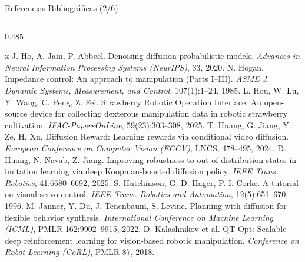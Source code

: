 \documentclass[aspectratio=169,10pt,xcolor={dvipsnames,table}]{beamer}
\begin{document}
\begin{frame}{Referencias Bibliográficas (2/6)}
\begin{columns}[T, onlytextwidth]
\begin{column}{0.485\textwidth}
      \begin{thebibliography}{x}\setlength{\itemsep}{0.8pt}
         J. Ho, A. Jain, P. Abbeel. \newblock Denoising diffusion probabilistic models. \newblock \emph{Advances in Neural Information Processing Systems (NeurIPS)}, 33, 2020.
         N. Hogan. \newblock Impedance control: An approach to manipulation (Parts I--III). \newblock \emph{ASME J. Dynamic Systems, Measurement, and Control}, 107(1):1--24, 1985.
         L. Hou, W. Lu, Y. Wang, C. Peng, Z. Fei. \newblock Strawberry Robotic Operation Interface: An open-source device for collecting dexterous manipulation data in robotic strawberry cultivation. \newblock \emph{IFAC-PapersOnLine}, 59(23):303--308, 2025.
         T. Huang, G. Jiang, Y. Ze, H. Xu. \newblock Diffusion Reward: Learning rewards via conditional video diffusion. \newblock \emph{European Conference on Computer Vision (ECCV)}, LNCS, 478--495, 2024.
         D. Huang, N. Navab, Z. Jiang. \newblock Improving robustness to out-of-distribution states in imitation learning via deep Koopman-boosted diffusion policy. \newblock \emph{IEEE Trans. Robotics}, 41:6680--6692, 2025.
         S. Hutchinson, G. D. Hager, P. I. Corke. \newblock A tutorial on visual servo control. \newblock \emph{IEEE Trans. Robotics and Automation}, 12(5):651--670, 1996.
         M. Janner, Y. Du, J. Tenenbaum, S. Levine. \newblock Planning with diffusion for flexible behavior synthesis. \newblock \emph{International Conference on Machine Learning (ICML)}, PMLR 162:9902--9915, 2022.
         D. Kalashnikov et al. \newblock QT-Opt: Scalable deep reinforcement learning for vision-based robotic manipulation. \newblock \emph{Conference on Robot Learning (CoRL)}, PMLR 87, 2018.
      \end{thebibliography}
    \end{column}
  \end{columns}
\end{frame}
\end{document}
